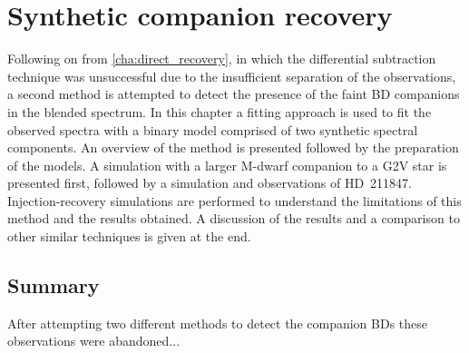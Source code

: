 
\chapter{Synthetic companion recovery}  %
\label{cha:model_comparison}

Following on from \cref{cha:direct_recovery}, in which the differential subtraction technique was unsuccessful due to the insufficient separation of the observations, a second method is attempted to detect the presence of the faint {BD} companions in the blended spectrum.
In this chapter a \textchisquared{} fitting approach is used to fit the observed spectra with a binary model comprised of two synthetic spectral components.
An overview of the method is presented followed by the preparation of the models.
A simulation with a larger M-dwarf companion to a G2V star is presented first, followed by a simulation and observations of {HD~211847}.
Injection-recovery simulations are performed to understand the limitations of this method and the results obtained.
A discussion of the results and a comparison to other similar techniques is given at the end.









\section{Summary}

After attempting two different methods to detect the companion {BD}s these observations were abandoned...
